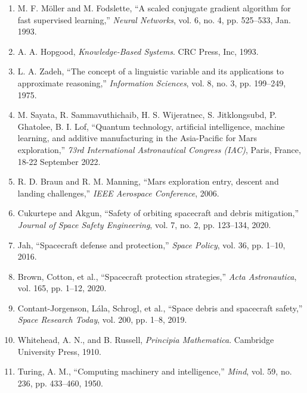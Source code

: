\documentclass[a4paper, 11pt]{article}
\begin{document}
\begin{enumerate}
    \item M. F. Möller and M. Fodslette, “A scaled conjugate gradient algorithm for fast supervised learning,” \textit{Neural Networks}, vol. 6, no. 4, pp. 525–533, Jan. 1993.
    
    \item A. A. Hopgood, \textit{Knowledge-Based Systems}. CRC Press, Inc, 1993.
    
    \item L. A. Zadeh, “The concept of a linguistic variable and its applications to approximate reasoning,” \textit{Information Sciences}, vol. 8, no. 3, pp. 199–249, 1975.
    
    \item M. Sayata, R. Sammavuthichaib, H. S. Wijeratnec, S. Jitklongsubd, P. Ghatolee, B. I. Lof, “Quantum technology, artificial intelligence, machine learning, and additive manufacturing in the Asia-Pacific for Mars exploration,” \textit{73rd International Astronautical Congress (IAC)}, Paris, France, 18-22 September 2022.
    
    \item R. D. Braun and R. M. Manning, “Mars exploration entry, descent and landing challenges,” \textit{IEEE Aerospace Conference}, 2006.
    
    \item Cukurtepe and Akgun, “Safety of orbiting spacecraft and debris mitigation,” \textit{Journal of Space Safety Engineering}, vol. 7, no. 2, pp. 123–134, 2020.
    
    \item Jah, “Spacecraft defense and protection,” \textit{Space Policy}, vol. 36, pp. 1–10, 2016.
    
    \item Brown, Cotton, et al., “Spacecraft protection strategies,” \textit{Acta Astronautica}, vol. 165, pp. 1–12, 2020.
    
    \item Contant-Jorgenson, Lála, Schrogl, et al., “Space debris and spacecraft safety,” \textit{Space Research Today}, vol. 200, pp. 1–8, 2019.
    
    \item Whitehead, A. N., and B. Russell, \textit{Principia Mathematica}. Cambridge University Press, 1910.
    
    \item Turing, A. M., “Computing machinery and intelligence,” \textit{Mind}, vol. 59, no. 236, pp. 433–460, 1950.
    

\end{enumerate}
\end{document}
